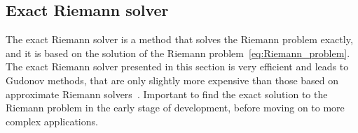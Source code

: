 
\subsection{Exact Riemann solver}
The exact Riemann solver is a method that solves the Riemann problem exactly, and it is based on the solution of the Riemann problem~\eqref{eq:Riemann_problem}.
The exact Riemann solver presented in this section is very efficient and leads to Gudonov methods, that are only slightly more expensive than those based on approximate Riemann solvers~\cite{Toro2001-Shock}.
Important to find the exact solution to the Riemann problem in the early stage of development, before moving on to more complex applications.

